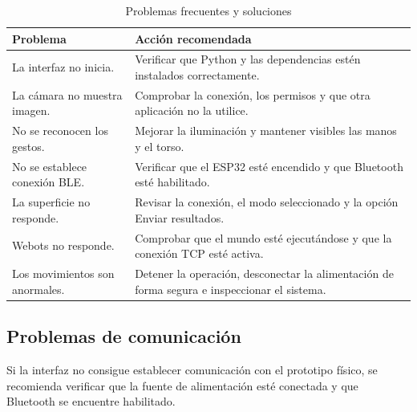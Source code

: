 \documentclass[letterpaper,journal]{IEEEtran}
\begin{document}
\begin{table}[!t]
    \caption{Problemas frecuentes y soluciones}
    \label{tab:solucion_problemas}
    \centering
    \footnotesize
    \begin{tabularx}{\columnwidth}{X X}
        \toprule
        \textbf{Problema} & \textbf{Acción recomendada} \\
        \midrule

        La interfaz no inicia.
        &
        Verificar que Python y las dependencias
        estén instalados correctamente. \\

        La cámara no muestra imagen.
        &
        Comprobar la conexión, los permisos
        y que otra aplicación no la utilice. \\

        No se reconocen los gestos.
        &
        Mejorar la iluminación y mantener
        visibles las manos y el torso. \\

        No se establece conexión BLE.
        &
        Verificar que el ESP32 esté encendido
        y que Bluetooth esté habilitado. \\

        La superficie no responde.
        &
        Revisar la conexión, el modo seleccionado
        y la opción Enviar resultados. \\

        Webots no responde.
        &
        Comprobar que el mundo esté ejecutándose
        y que la conexión TCP esté activa. \\

        Los movimientos son anormales.
        &
        Detener la operación, desconectar
        la alimentación de forma segura
        e inspeccionar el sistema. \\

        \bottomrule
    \end{tabularx}
\end{table}

\subsection{Problemas de comunicación}

Si la interfaz no consigue establecer
comunicación con el prototipo físico,
se recomienda verificar que la fuente
de alimentación esté conectada y que
Bluetooth se encuentre habilitado.
\end{document}
